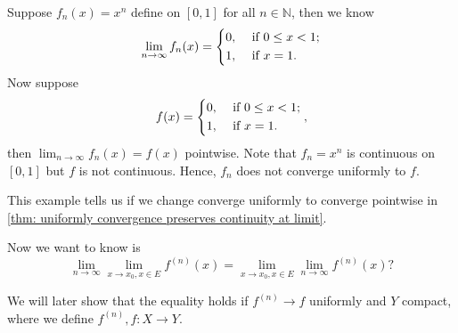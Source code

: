 \begin{eg}
    Suppose \(f_n(x) = x^n\) define on \([0, 1]\) for all \(n \in \mathbb{N} \), then we know 
    \[
        \lim_{n \to \infty} f_n(x) = \begin{dcases}
           0 , &\text{ if }  0 \le x < 1;\\
            1 , &\text{ if } x = 1.
        \end{dcases} 
    \] 
    Now suppose 
    \[
        f(x) = \begin{dcases}
           0 , &\text{ if }  0 \le x < 1;\\
            1 , &\text{ if } x = 1.
        \end{dcases} ,
    \] then \(\lim_{n \to \infty} f_n(x) = f(x) \) pointwise. Note that \(f_n = x^n\) is continuous on \([0, 1]\) but \(f\) is not continuous. Hence, \(f_n\) does not converge uniformly to \(f\).      
\end{eg}

\begin{remark}
    This example tells us if we change converge uniformly to converge pointwise in \autoref{thm: uniformly convergence preserves continuity at limit}. 
\end{remark}

Now we want to know is 
\[
    \lim_{n \to \infty} \lim_{x \to x_0, x \in E} f^{(n)}(x) = \lim_{x \to x_0, x \in E} \lim_{n \to \infty} f^{(n)}(x)?    
\]

We will later show that the equality holds if \(f^{(n)} \to f\) uniformly and \(Y\) compact, where we define \(f^{(n)}, f: X \to Y\). 

